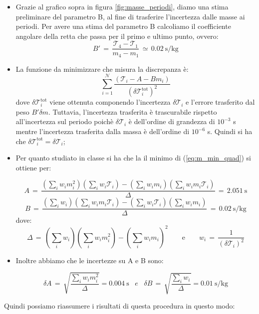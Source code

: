\begin{itemize}
	\item{Grazie al grafico sopra in figura \ref{fig:masse_periodi}, diamo una stima preliminare del parametro B, al fine di trasferire
        l'incertezza dalle masse ai periodi. Per avere una stima del parametro B calcoliamo il coefficiente angolare della retta che
        passa per il primo e ultimo punto, ovvero:
			\begin{equation*}
				B' \,=\, \frac{\mathcal{T}_4 - \mathcal{T}_1}{m_4 - m_1} \,\simeq\, \SI{0.02}{\second\per\kilo\gram}
			\end{equation*}
			}
	\item{La funzione da minimizzare che misura la discrepanza è:
			\begin{equation}
                \sum_{i=1}^{\mathcal{N}} \frac{(\mathcal{T}_i - A - B m_i)}{(\delta \mathcal{T}_i^\text{tot})^2}	
                \label{eq:m_min_quad}
			\end{equation}
            dove $\delta \mathcal{T}_i^\text{tot}$ viene ottenuta componendo
            l'incertezza $\delta \mathcal{T}_i$ e l'errore trasferito dal peso $B'\delta m$. Tuttavia, l'incertezza
            trasferita è trascurabile rispetto all'incertezza sul periodo poichè $\delta \mathcal{T}_i$ è dell'ordine di
            grandezza di $10^{-3}$ s mentre l'incertezza trasferita dalla massa è dell'ordine di $10^{-6}$ s.
            Quindi si ha che $\delta \mathcal{T}_i^\text{tot} = \delta \mathcal{T}_i$;}
	\item{Per quanto studiato in classe si ha che la il minimo di (\ref{eq:m_min_quad}) si ottiene per:

			\begin{equation*}
				A \,=\, \frac{(\sum_i w_i m_i^2)(\sum_i w_i \mathcal{T}_i) - (\sum_i w_i m_i)(\sum_i w_i m_i \mathcal{T}_i)}{\Delta}
                \,=\, \SI{2.051}{\second}
			\end{equation*}
			\begin{equation*}
				B \,=\, \frac{(\sum_i w_i)(\sum_i w_i m_i \mathcal{T}_i) - (\sum_i w_i \mathcal{T}_i)(\sum_i w_i m_i)}{\Delta}
                \,=\, \SI{0.02}{\second\per\kilo\gram}
			\end{equation*}
			dove:
			\begin{equation*}
				\Delta \,=\, (\sum_i w_i)(\sum_i w_i m_i^2) - (\sum_i w_i m_i)^2 \qquad \text{e} \qquad
				w_i \,=\, \frac{1}{(\delta \mathcal{T}_i)^2}
			\end{equation*}}
	\item{Inoltre abbiamo che le incertezze su A e B sono:

			\begin{equation*}
				\delta A \,=\, \sqrt{\frac{\sum_i w_i m_i^2}{\Delta}} = \SI{0.004}{\second}  \,\,\,\,\, e \,\,\,\,\,
				\delta B \,=\, \sqrt{\frac{\sum_i w_i}{\Delta}} = \SI{0.01}{\second\per\kilo\gram}
			\end{equation*}}
	\end{itemize} 
	Quindi possiamo riassumere i risultati di questa procedura in questo modo:


